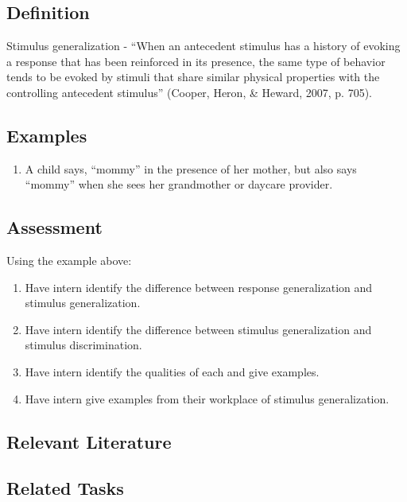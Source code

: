 \clearpage \section{\fourFKThirtySeven{}}
\subsection{Definition} 
Stimulus generalization - ``When an antecedent stimulus has a history of evoking a response that has been reinforced in its presence, the same type of behavior tends to be evoked by stimuli that share similar physical properties with the controlling antecedent stimulus'' (Cooper, Heron, \& Heward, 2007, p. 705).
%
\subsection{Examples}
\begin{enumerate}
\item  A child says, ``mommy'' in the presence of her mother, but also says ``mommy'' when she sees her grandmother or daycare provider.
%
\end{enumerate}
%
\subsection{Assessment}
Using the example above:
\begin{enumerate}
\item Have intern identify the difference between response generalization and stimulus generalization.
\item Have intern identify the difference between stimulus generalization and stimulus discrimination. 
\item Have intern identify the qualities of each and give examples.
\item Have intern give examples from their workplace of stimulus generalization.
\end{enumerate}
%
\subsection{Relevant Literature}
\begin{refsection}
\nocite{baer1968some,
        cooper2007applied,
        cuvo2003stimulus,
        guttman1956discriminability,
        johnston1979relation,
        stokes1977implicit}
\printbibliography[heading=none]
\end{refsection}
%
\subsection{Related Tasks}
\fourbOne{}\\
\foureSix{}\\
\fourjEleven{}\\
\fourjFourteen{}\\
\fourFKTen{}\\
\fourFKEleven{}\\
\fourFKTwelve{}\\
\fourFKThirtySix{}\\
